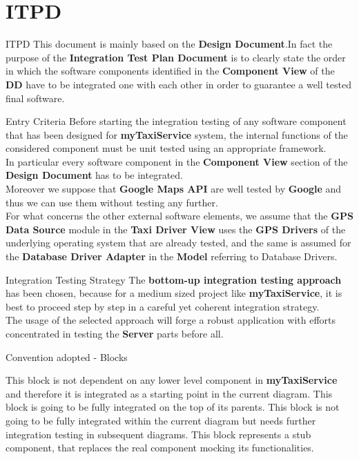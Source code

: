 \documentclass{../common/latex_classes/pdf_presentation}
\begin{document}
	\section{ITPD}
	\begin{frame}{ITPD}
		This document is mainly based on the \textbf{Design Document}.In fact the purpose of the \textbf{Integration Test Plan Document} is to clearly state the order in which the software components identified in the \textbf{Component View} of the \textbf{DD} have to be integrated one with each other in order to guarantee a well tested final software.
	\end{frame}
	\begin{frame}{Entry Criteria}
		Before starting the integration testing of any software component that has been designed for \textbf{myTaxiService} system, the internal functions of the considered component must be unit tested using an appropriate framework.\\
		In particular every software component in the \textbf{Component View} section of the \textbf{Design Document} has to be integrated.\\
		Moreover we suppose that \textbf{Google Maps API} are well tested by \textbf{Google} and thus we can use them without testing any further.\\
		For what concerns the other external software elements, we assume that the \textbf{GPS Data Source} module in the \textbf{Taxi Driver View} uses the \textbf{GPS Drivers} of the underlying operating system that are already tested, and the same is assumed for the \textbf{Database Driver Adapter} in the \textbf{Model} referring to Database Drivers.
	\end{frame}
	\begin{frame}{Integration Testing Strategy}
		The \textbf{bottom-up integration testing approach} has been chosen, because for a medium sized project like \textbf{myTaxiService}, it is best to proceed step by step in a careful yet coherent integration strategy.\\
		The usage of the selected approach will forge a robust application with efforts concentrated in testing the \textbf{Server} parts before all.\\
	\end{frame}
	\begin{frame}{Convention adopted - Blocks}
		\begin{itemize}
			 This block is not dependent on any lower level component in \textbf{myTaxiService} and therefore it is integrated as a starting point in the current diagram.
			 This block is going to be fully integrated on the top of its parents.
			 This block is not going to be fully integrated within the current diagram but needs further integration testing in subsequent diagrams.
			 This block represents a stub component, that replaces the real component mocking its functionalities.
		\end{itemize}
	\end{frame}
\end{document}
